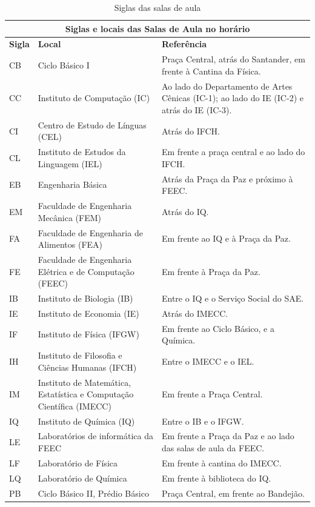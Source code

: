 \begin{center}
\begin{table}[ht!]
{
\begin{tabular}{|l|p{6cm}|p{8cm}|}\hline

\multicolumn{3}{|c|}{ \textbf{Siglas e locais das Salas de Aula no horário}}\tabularnewline \hline

 \textbf{Sigla}  &  \textbf{Local}  &  \textbf{Referência}\tabularnewline \hline

 CB  &  Ciclo Básico I  &  Praça Central, atrás do Santander, em frente à Cantina da Física.\tabularnewline \hline

 CC  &  Instituto de Computação (IC)  &  Ao lado do Departamento de Artes Cênicas (IC-1); ao lado do IE (IC-2) e atrás do IE (IC-3).\tabularnewline \hline

 CI  &  Centro de Estudo de Línguas (CEL)  &  Atrás do IFCH.\tabularnewline \hline

 CL  &  Instituto de Estudos da Linguagem (IEL)  &  Em frente a praça central e ao lado do IFCH.\tabularnewline \hline

 EB  &  Engenharia Básica  &  Atrás da Praça da Paz e próximo à FEEC.\tabularnewline \hline

 EM  &  Faculdade de Engenharia Mecânica (FEM)  &  Atrás do IQ.\tabularnewline \hline

 FA  &  Faculdade de Engenharia de Alimentos (FEA)  &  Em frente ao IQ e à Praça da Paz.\tabularnewline \hline

 FE  &  Faculdade de Engenharia Elétrica e de Computação (FEEC)  &  Em frente à Praça da Paz.\tabularnewline \hline

 IB  &  Instituto de Biologia (IB)  &  Entre o IQ e o Serviço Social do SAE.\tabularnewline \hline

 IE  &  Instituto de Economia (IE)  &  Atrás do IMECC.\tabularnewline \hline

 IF  &  Instituto de Física (IFGW)  &  Em frente ao Ciclo Básico, e a Química.\tabularnewline \hline

 IH  &  Instituto de Filosofia e Ciências Humanas (IFCH)  &  Entre o IMECC e o IEL.\tabularnewline \hline

 IM  &  Instituto de Matemática, Estatística e Computação Científica (IMECC)  &  Em frente a Praça Central.\tabularnewline \hline

 IQ  &  Instituto de Química (IQ)  &  Entre o IB e o IFGW.\tabularnewline \hline

 LE  &  Laboratórios de informática da FEEC  &  Em frente a Praça da Paz e ao lado das salas de aula da FEEC.\tabularnewline \hline

 LF  &  Laboratório de Física  &  Em frente à cantina do IMECC.\tabularnewline \hline

 LQ  &  Laboratório de Química  &  Em frente à biblioteca do IQ.\tabularnewline \hline

 PB  &  Ciclo Básico II, Prédio Básico  &  Praça Central, em frente ao Bandejão.\tabularnewline \hline

\end{tabular}
}
\hfill{}
\caption{Siglas das salas de aula}
\label{tab:institutos}
\end{table}
\end{center}

